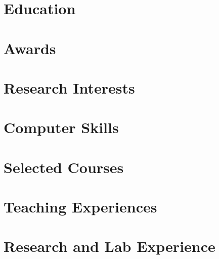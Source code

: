 \documentclass[10pt]{article}
\begin{document}
  
  \vspace{-20pt}
  \begin{paracol}{2}
    \section{Education}
      
    \section{Awards}
      
    \section{Research Interests}
      
    \section{Computer Skills}
      
    \section{Selected Courses}
      
    \section{Teaching Experiences}
      
    \switchcolumn
    \section{Research and Lab Experience}
      
%      
  \end{paracol}
\end{document}
